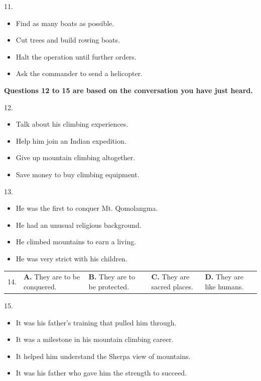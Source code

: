 \documentclass[UTF8,11pt]{ctexart}
\begin{document}
11.


\begin{itemize}[leftmargin=2em,itemsep=.2em,topsep=.4em]\item[A.] Find as many boats as possible.
\item[B.] Cut trees and build rowing boats.
\item[C.] Halt the operation until further orders.
\item[D.] Ask the commander to send a helicopter.
\end{itemize}

\textbf{Questions 12 to 15 are based on the conversation you have just heard.}


12.


\begin{itemize}[leftmargin=2em,itemsep=.2em,topsep=.4em]\item[A.] Talk about his climbing experiences.
\item[B.] Help him join an Indian expedition.
\item[C.] Give up mountain climbing altogether.
\item[D.] Save money to buy climbing equipment.
\end{itemize}

13.


\begin{itemize}[leftmargin=2em,itemsep=.2em,topsep=.4em]\item[A.] He was the first to conquer Mt. Qomolangma.
\item[B.] He had an unusual religious background.
\item[C.] He climbed mountains to earn a living.
\item[D.] He was very strict with his children.
\end{itemize}

\noindent\begin{tabularx}{\linewidth}{@{}lXXXX@{}}14. & \textbf{A.} They are to be conquered. & \textbf{B.} They are to be protected. & \textbf{C.} They are sacred places. & \textbf{D.} They are like humans.\\\end{tabularx}\par

15.


\begin{itemize}[leftmargin=2em,itemsep=.2em,topsep=.4em]\item[A.] It was his father’s training that pulled him through.
\item[B.] It was a milestone in his mountain climbing career.
\item[C.] It helped him understand the Sherpa view of mountains.
\item[D.] It was his father who gave him the strength to succeed.
\end{itemize}
\end{document}
